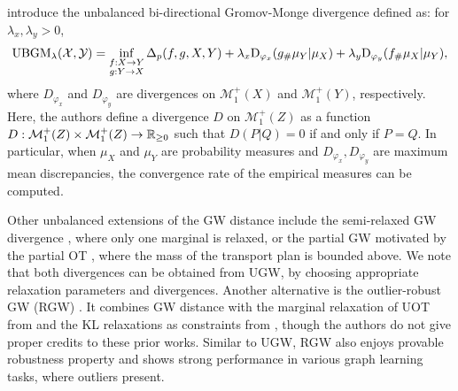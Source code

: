 \citet{Zhang21} introduce the unbalanced bi-directional Gromov-Monge divergence defined as:
for $\lambda_x, \lambda_y > 0$,
\begin{align}
    \text{UBGM}_{\lambda}(\mathcal X, \mathcal Y) = \inf_{\substack{f: X \to Y \\ g: Y \to X}}
  \Delta_p(f,g, X, Y) + \lambda_x \text{D}_{\varphi_x}(g_{\#} \mu_Y | \mu_X)
  + \lambda_y \text{D}_{\varphi_y}(f_{\#}\mu_X | \mu_Y),
\end{align}
where $D_{\varphi_x}$ and $D_{\varphi_y}$ are divergences on $\mathcal M^+_1(X)$ and $\mathcal M^+_1(Y)$,
respectively. Here, the authors define a divergence $D$ on $\mathcal M^+_1(Z)$ as a function
$D: \mathcal M^+_1(Z) \times \mathcal M^+_1(Z) \to \mathbb R_{\geq 0}$ such that
$D(P | Q) = 0$ if and only if $P = Q$. In particular, when $\mu_X$ and $\mu_Y$
are probability measures and $D_{\varphi_x}, D_{\varphi_y}$ are maximum mean discrepancies,
the convergence rate of the empirical measures can be computed.

Other unbalanced extensions of the GW distance include the semi-relaxed GW divergence \citep{Vincent22},
where only one marginal is relaxed, or the partial GW \citep{Chapel20}
motivated by the partial OT \citep{Caffarelli10, Figalli10}, where the mass of the transport plan
is bounded above. We note that both divergences can be obtained from UGW,
by choosing appropriate relaxation parameters and divergences.
Another alternative is the outlier-robust GW (RGW) \citep{Kong23}. It combines GW distance with
the marginal relaxation of UOT from \citep{Liero18} and
the KL relaxations as constraints from \citep{Balaji20},
though the authors do not give proper credits to these prior works.
Similar to UGW, RGW also enjoys provable robustness property and shows strong performance
in various graph learning tasks, where outliers present.
